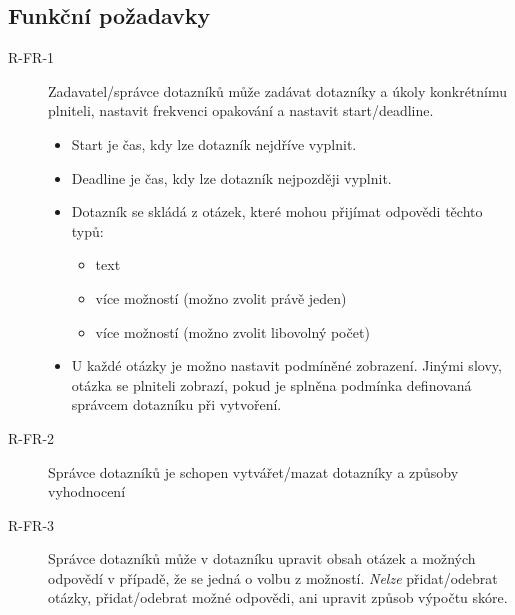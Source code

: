 \subsection{Funkční požadavky}\label{subsec:funkcni-pozadavky}
\begin{description}
    \item[R-FR-1]
    Zadavatel/správce dotazníků může zadávat dotazníky a úkoly konkrétnímu plniteli, nastavit frekvenci opakování a nastavit start/deadline.

    \begin{itemize}
        \item
        Start je čas, kdy lze dotazník nejdříve vyplnit.
        \item
        Deadline je čas, kdy lze dotazník nejpozději vyplnit.
        \item
        Dotazník se skládá z otázek, které mohou přijímat odpovědi těchto typů:

        \begin{itemize}
            \item
            text
            \item
            více možností (možno zvolit právě jeden)
            \item
            více možností (možno zvolit libovolný počet)
        \end{itemize}
        \item
        U každé otázky je možno nastavit podmíněné zobrazení.
        Jinými slovy, otázka se plniteli zobrazí, pokud je splněna podmínka definovaná správcem dotazníku při vytvoření.
    \end{itemize}
    \item[R-FR-2]
    Správce dotazníků je schopen vytvářet/mazat dotazníky a způsoby vyhodnocení
    \item[R-FR-3]
    Správce dotazníků může v dotazníku upravit obsah otázek a možných odpovědí v případě, že se jedná o volbu z možností.
    \textit{Nelze} přidat/odebrat otázky, přidat/odebrat možné odpovědi, ani upravit způsob výpočtu skóre.


\end{description}
